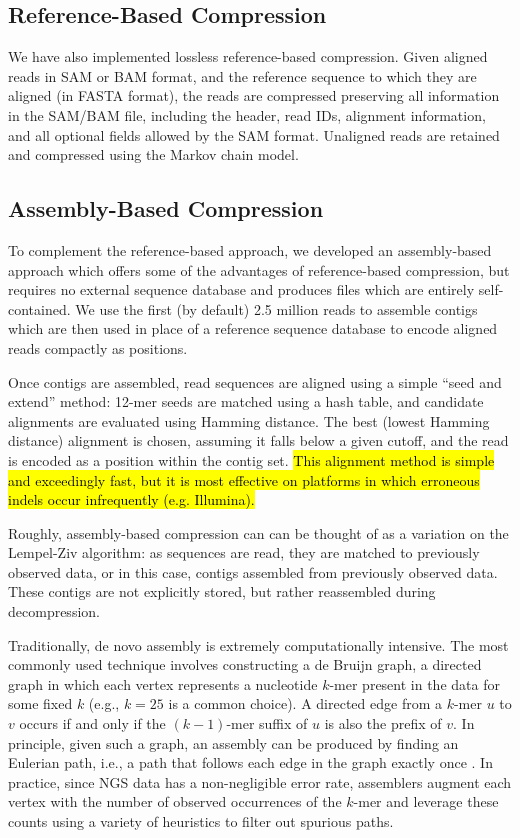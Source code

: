 \documentclass[a4,center,fleqn]{NAR}
\begin{document}
\subsection{Reference-Based Compression}

We have also implemented lossless reference-based compression. Given aligned
reads in SAM or BAM format, and the reference sequence to which they are
aligned (in FASTA format), the reads are compressed preserving all information
in the SAM/BAM file, including the header, read IDs, alignment information,
and all optional fields allowed by the SAM format. Unaligned reads are
retained and compressed using the Markov chain model.


\subsection{Assembly-Based Compression}

To complement the reference-based approach, we developed an assembly-based
approach which offers some of the advantages of reference-based compression,
but requires no external sequence database and produces files which are
entirely self-contained. We use the first (by default) 2.5 million reads to
assemble contigs which are then used in place of a reference sequence
database to encode aligned reads compactly as positions.

Once contigs are assembled, read sequences are aligned using a simple ``seed
and extend'' method: 12-mer seeds are matched using a hash table, and
candidate alignments are evaluated using Hamming distance. The best
(lowest Hamming distance) alignment is chosen, assuming it falls below a given
cutoff, and the read is encoded as a position within the contig set. \hl{This
alignment method is simple and exceedingly fast, but it is most effective
on platforms in which erroneous indels occur infrequently (e.g. Illumina).}

Roughly, assembly-based compression can can be thought of as a variation on
the Lempel-Ziv algorithm: as sequences are read, they are matched to
previously observed data, or in this case, contigs assembled from previously
observed data. These contigs are not explicitly stored, but rather reassembled
during decompression.



Traditionally, de novo assembly is extremely computationally intensive. The
most commonly used technique involves constructing a de Bruijn graph, a
directed graph in which each vertex represents a nucleotide $k$-mer present in
the data for some fixed $k$ (e.g., $k = 25$ is a common choice). A directed
edge from a $k$-mer $u$ to $v$ occurs if and only if the $(k - 1)$-mer suffix
of $u$ is also the prefix of $v$. In principle, given such a graph, an
assembly can be produced by finding an Eulerian path, i.e., a path that
follows each edge in the graph exactly once \citep{Pevzner2001}. In practice,
since NGS data has a non-negligible error rate, assemblers augment each vertex
with the number of observed occurrences of the $k$-mer and leverage these
counts using a variety of heuristics to filter out spurious paths.
\end{document}
